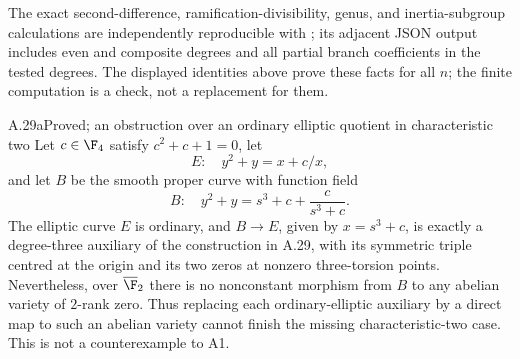The exact second-difference, ramification-divisibility, genus,
and inertia-subgroup calculations are independently reproducible
with ; its
adjacent JSON output includes even and composite degrees and
all partial branch coefficients in the tested degrees.
The displayed identities above prove these facts for all $n$;
the finite computation is a check, not a replacement for them.

\begin{claim}{A.29a}{Proved; an obstruction over an ordinary elliptic quotient in characteristic two}
Let $c\in\F_4$ satisfy $c^2+c+1=0$, let
\[
 E:\quad y^2+y=x+c/x,
\]
and let $B$ be the smooth proper curve with function field
\[
 B:\quad y^2+y=s^3+c+\frac{c}{s^3+c}.                       \tag{A.22}
\]
The elliptic curve $E$ is ordinary, and $B\to E$, given by
$x=s^3+c$, is exactly a degree-three auxiliary of the
construction in A.29, with its symmetric triple centred at
the origin and its two zeros at nonzero three-torsion points.
Nevertheless, over $\overline{\F}_2$ there is no nonconstant
morphism from $B$ to any abelian variety of $2$-rank zero.
Thus replacing each ordinary-elliptic auxiliary by a direct
map to such an abelian variety cannot finish the missing
characteristic-two case. This is not a counterexample to A1.
\end{claim}
